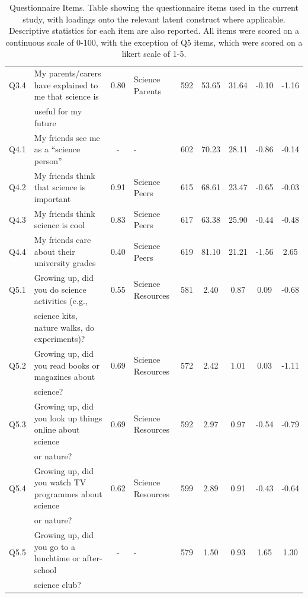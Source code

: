 \begin{landscape}
\begin{table}
\begin{tabular}[width = \textwidth]{clclccccc}
Q3.4 & My parents/carers have explained to me that science is & 0.80 & Science Parents & 592	&53.65	&31.64	& -0.10	&-1.16	\\  
&useful for my future&&&&&&&\\
  \hline
Q4.1 & My friends see me as a ``science person'' & - & - &  602	&70.23&	28.11 &-0.86&-0.14\\
Q4.2 & My friends think that science is important & 0.91 & Science Peers & 615&68.61&	23.47 & -0.65&-0.03 \\
Q4.3 & My friends think science is cool & 0.83 & Science Peers &617&63.38&25.90 & -0.44&-0.48\\ 
Q4.4 & My friends care about their university grades & 0.40 & Science Peers &619&	81.10&	21.21 &-1.56&2.65 \\
  \hline
Q5.1 & Growing up, did you do science activities (e.g.,  & 0.55 & Science Resources& 581	&2.40&0.87 & 0.09&-0.68 \\ 
&science kits, nature walks, do experiments)?&&&&&&&\\
Q5.2 & Growing up, did you read books or magazines about & 0.69 & Science Resources &572	&2.42&1.01 & 0.03&-1.11\\
&science?&&&&&&&\\
Q5.3 & Growing up, did you look up things online about science & 0.69 & Science Resources &592&2.97&0.97 &-0.54&-0.79	\\
&or nature?&&&&&&&\\
Q5.4 & Growing up, did you watch TV programmes about science & 0.62 & Science Resources &599&2.89&0.91 &-0.43&	-0.64\\
&or nature?&&&&&&&\\
Q5.5 & Growing up, did you go to a lunchtime or after-school & - &-&579&1.50&0.93 & 1.65&	1.30\\
&science club?&&&&&&&\\

   \hline
\end{tabular}
\caption{Questionnaire Items. Table showing the questionnaire items used in the current study, with loadings onto the relevant latent construct where applicable. Descriptive statistics for each item are also reported. All items were scored on a continuous scale of 0-100, with the exception of Q5 items, which were scored on a likert scale of 1-5.} 
\end{table}
\end{landscape}

